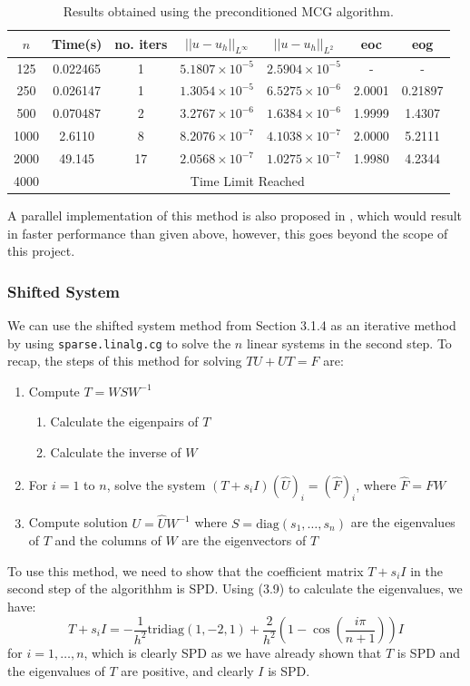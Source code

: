 \documentclass[11pt]{article}
\numberwithin{equation}{section}
\begin{document}
\begin{table}[H]
\centering
\begin{tabular}{|c|c|c|c|c|c|c|}
\hline
$n$ & Time(s) & no. iters & $|| u - u_h ||_{L^{\infty}}$ &$|| u - u_h ||_{L^{2}}$ & eoc & eog \\
\hline
125 & 0.022465 & 1 & $5.1807 \times 10^{-5}$ & $2.5904 \times 10^{-5}$ & - & - \\
250 & 0.026147 & 1 & $1.3054 \times 10^{-5}$ & $6.5275 \times 10^{-6}$ & 2.0001 & 0.21897 \\
500 & 0.070487 & 2 & $3.2767 \times 10^{-6}$ & $1.6384 \times 10^{-6}$ & 1.9999 & 1.4307 \\
1000 & 2.6110 & 8 & $8.2076 \times 10^{-7}$ & $4.1038 \times 10^{-7}$ & 2.0000 & 5.2111 \\
2000 & 49.145 & 17 & $2.0568 \times 10^{-7}$ & $1.0275 \times 10^{-7}$ & 1.9980 & 4.2344 \\
\cline{2-7}
4000 & \multicolumn{6}{c|}{Time Limit Reached} \\
\hline
\end{tabular}
\captionsetup{justification=centering}
\caption{Results obtained using the preconditioned MCG algorithm.}
\label{table:pre MCG}
\end{table}

A parallel implementation of this method is also proposed in \cite{Hou}, which would result in faster performance than given above, however, this goes beyond the scope of this project.

\subsubsection{Shifted System}
We can use the shifted system method from Section 3.1.4 as an iterative method by using \texttt{sparse.linalg.cg} to solve the $n$ linear systems in the second step. To recap, the steps of this method for solving $TU+UT=F$ are:
\begin{enumerate}
\item Compute $T = WSW^{-1}$
	\begin{enumerate}
	\item Calculate the eigenpairs of $T$
	\item Calculate the inverse of $W$
	\end{enumerate}
\item For $i=1$ to $n$, solve the system $(T+s_i I)(\hat{U})_i = (\hat{F})_i$, where $\hat{F} = FW$
\item Compute solution $U = \hat{U}W^{-1}$
where $S = \text{diag}(s_1, \dots, s_n)$ are the eigenvalues of $T$ and the columns of $W$ are the eigenvectors of $T$
\end{enumerate}
To use this method, we need to show that the coefficient matrix $T+s_i I$ in the second step of the algorithhm is SPD. Using (3.9) to calculate the eigenvalues, we have:
\begin{equation} 
T+s_i I = -\frac{1}{h^2} \text{tridiag}(1,-2,1) + \frac{2}{h^2}\left(1 - \cos\left(\frac{i\pi}{n+1}\right)\right)I
\end{equation}
for $i=1,\dots,n$, which is clearly SPD as we have already shown that $T$ is SPD and the eigenvalues of $T$ are positive, and clearly $I$ is SPD. 
\end{document}
